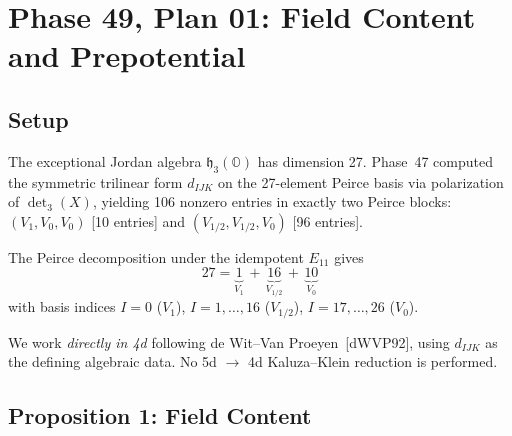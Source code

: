 
%

\section*{Phase 49, Plan 01: Field Content and Prepotential}

\subsection*{Setup}

The exceptional Jordan algebra $\mathfrak{h}_3(\mathbb{O})$ has dimension 27.
Phase~47 computed the symmetric trilinear form $d_{IJK}$ on the
27-element Peirce basis via polarization of $\det_3(X)$, yielding 106
nonzero entries in exactly two Peirce blocks:
$(V_1, V_0, V_0)$ [10 entries] and $(V_{1/2}, V_{1/2}, V_0)$ [96 entries].

The Peirce decomposition under the idempotent $E_{11}$ gives
\begin{equation}\tag{49.0}
  27 = \underbrace{1}_{V_1} \,+\, \underbrace{16}_{V_{1/2}} \,+\,
       \underbrace{10}_{V_0}
\end{equation}
with basis indices $I = 0$ ($V_1$), $I = 1, \ldots, 16$ ($V_{1/2}$),
$I = 17, \ldots, 26$ ($V_0$).

We work \emph{directly in 4d} following de Wit--Van Proeyen~[dWVP92],
using $d_{IJK}$ as the defining algebraic data. No 5d $\to$ 4d
Kaluza--Klein reduction is performed.


\subsection*{Proposition 1: Field Content}

